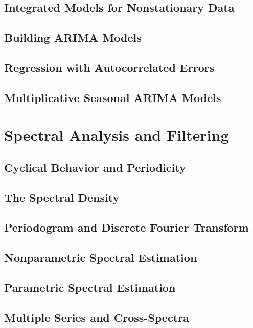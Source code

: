 \documentclass[12pt]{article}
\begin{document}
\subsection{Integrated Models for Nonstationary Data}

\subsection{Building ARIMA Models}

\subsection{Regression with Autocorrelated Errors}

\subsection{Multiplicative Seasonal ARIMA Models}


\section{Spectral Analysis and Filtering}
\subsection{Cyclical Behavior and Periodicity}

\subsection{The Spectral Density}

\subsection{Periodogram and Discrete Fourier Transform}

\subsection{Nonparametric Spectral Estimation}

\subsection{Parametric Spectral Estimation}

\subsection{Multiple Series and Cross-Spectra}
\end{document}
